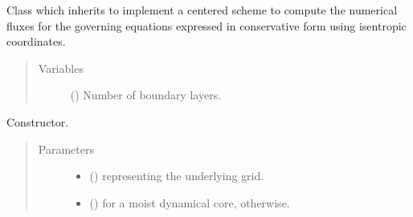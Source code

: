 \documentclass[letterpaper,10pt,english]{sphinxmanual}
\begin{document}
\begin{fulllineitems}
\label{\detokenize{api:dycore.flux_isentropic_centered.FluxIsentropicCentered}}
Class which inherits {\hyperref[\detokenize{api:dycore.flux_isentropic.FluxIsentropic}]{}} to implement a centered scheme to compute
the numerical fluxes for the governing equations expressed in conservative form using isentropic coordinates.
\begin{quote}\begin{description}
\item[{Variables}] \leavevmode
{\hyperref[\detokenize{api:dycore.prognostic_isentropic.PrognosticIsentropic.nb}]{}} () \textendash{} Number of boundary layers.

\end{description}\end{quote}

\begin{fulllineitems}
\label{\detokenize{api:dycore.flux_isentropic_centered.FluxIsentropicCentered.__init__}}
Constructor.
\begin{quote}\begin{description}
\item[{Parameters}] \leavevmode\begin{itemize}
\item {} 
 () \textendash{} {\hyperref[\detokenize{api:grids.grid_xyz.GridXYZ}]{}} representing the underlying grid.

\item {} 
 () \textendash{}  for a moist dynamical core,  otherwise.

\end{itemize}

\end{description}\end{quote}

\end{fulllineitems}


\end{fulllineitems}
\end{document}
